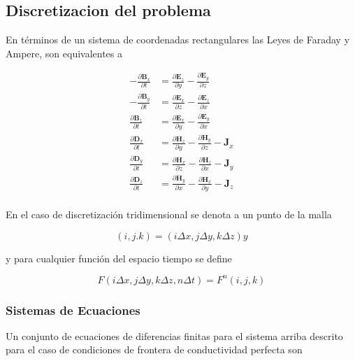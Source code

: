 \documentclass[]{article}
\begin{document}
\subsection{Discretizacion del
problema}\label{discretizacion-del-problema}

En términos de un sistema de coordenadas rectangulares las Leyes de
Faraday y Ampere, son equivalentes a

\begin{eqnarray}
- \frac{\partial \mathbf{B}_x}{\partial t} &= \frac{\partial \mathbf{E}_z}{\partial y} - \frac{\partial \mathbf{E}_y}{\partial z} \\
- \frac{\partial \mathbf{B}_y}{\partial t} &= \frac{\partial \mathbf{E}_x}{\partial z} - \frac{\partial \mathbf{E}_z}{\partial x} \\
\frac{\partial \mathbf{B}_z}{\partial t} &= \frac{\partial \mathbf{E}_x}{\partial y} - \frac{\partial \mathbf{E}_y}{\partial x} \\
\frac{\partial \mathbf{D}_x}{\partial t} &= \frac{\partial \mathbf{H}_z}{\partial y} - \frac{\partial \mathbf{H}_y}{\partial z} -\mathbf{J}_x \\
\frac{\partial \mathbf{D}_y}{\partial t} &= \frac{\partial \mathbf{H}_x}{\partial z} - \frac{\partial \mathbf{H}_z}{\partial x} -\mathbf{J}_y \\
\frac{\partial \mathbf{D}_z}{\partial t} &= \frac{\partial \mathbf{H}_y}{\partial x} - \frac{\partial \mathbf{H}_x}{\partial y} -\mathbf{J}_z \\
\end{eqnarray}

En el caso de discretización tridimensional se denota a un punto de la
malla

\begin{equation}
(i,j.k) = (i\Delta x, j\Delta y, k\Delta z) y 
\end{equation}

y para cualquier función del espacio tiempo se define

\begin{equation}
F(i\Delta x, j\Delta y, k\Delta z, n\Delta t) = F^n(i,j,k)
\end{equation}

\subsubsection{Sistemas de Ecuaciones}\label{sistemas-de-ecuaciones}

Un conjunto de ecuaciones de diferencias finitas para el sistema arriba
descrito para el caso de condiciones de frontera de conductividad
perfecta son
\end{document}
